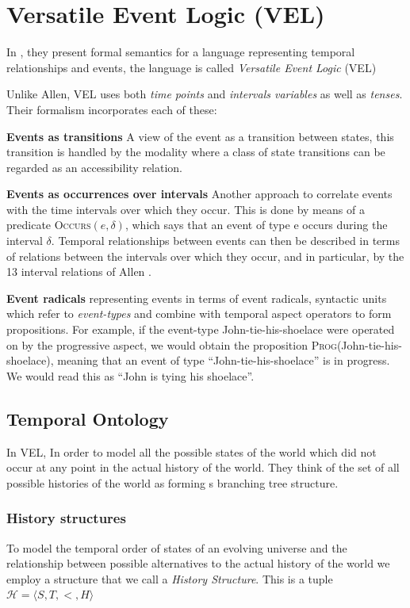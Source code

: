 \section{Versatile Event Logic (VEL)}
In \cite{bennett2001unifying}, they present formal semantics for a language representing temporal relationships and events, the language is called \textit{Versatile Event Logic }(VEL)

Unlike Allen, VEL uses both \textit{time points} and \textit{intervals variables} as well as \textit{tenses}.
Their formalism incorporates each of these:


\textbf{Events as transitions} A view of the event as a transition between states, this transition is handled by the modality
where a class of state transitions can be regarded as an accessibility relation.

\textbf{Events as occurrences over intervals}
Another approach to correlate events with the time intervals over which they occur.
This is done by means of a predicate \textsc{Occurs}$(e, \delta)$, which says that an event of type e occurs during
the interval $\delta$. Temporal relationships between events can then be described in terms of
relations between the intervals over which they occur, and in particular, by the 13 interval
relations of Allen \cite{allen1984towards}.

\textbf{Event radicals} representing events in terms of event radicals, syntactic
units which refer to \textit{event-types} and combine with temporal aspect operators to form
propositions. For example, if the event-type John-tie-his-shoelace were operated on by the
progressive aspect, we would obtain the proposition \textsc{Prog}(John-tie-his-shoelace), meaning
that an event of type ``John-tie-his-shoelace'' is in progress. We would read this as ``John is
tying his shoelace''.


\subsection{Temporal Ontology}
In VEL, In order to model all the possible states of the world which did not occur at any point in the actual
history of the world. They think of the set of all possible histories of the world as forming s branching tree structure.

\subsubsection{History structures}
To model the temporal order of states of an evolving universe and the relationship
between possible alternatives to the actual history of the world we employ a structure that
we call a \textit{History Structure}. This is a tuple $\mathcal{H} = \langle S, T, <, H \rangle$

